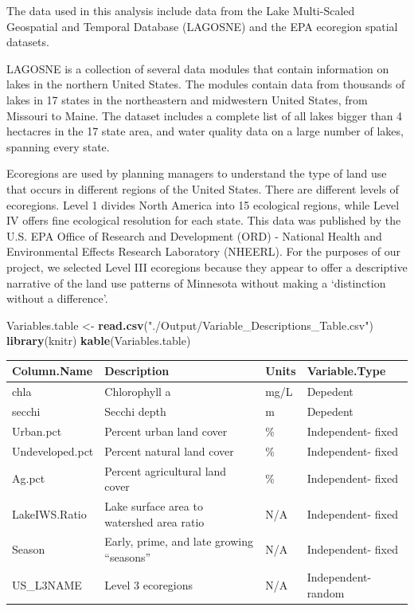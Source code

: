 \documentclass[12pt,]{article}
\newenvironment{Shaded}{\begin{snugshade}}{\end{snugshade}}
\newcommand{\KeywordTok}[1]{\textcolor[rgb]{0.13,0.29,0.53}{\textbf{#1}}}
\newcommand{\NormalTok}[1]{#1}
\newcommand{\StringTok}[1]{\textcolor[rgb]{0.31,0.60,0.02}{#1}}
\begin{document}
The data used in this analysis include data from the Lake Multi-Scaled
Geospatial and Temporal Database (LAGOSNE) and the EPA ecoregion spatial
datasets.

LAGOSNE is a collection of several data modules that contain information
on lakes in the northern United States. The modules contain data from
thousands of lakes in 17 states in the northeastern and midwestern
United States, from Missouri to Maine. The dataset includes a complete
list of all lakes bigger than 4 hectacres in the 17 state area, and
water quality data on a large number of lakes, spanning every state.

Ecoregions are used by planning managers to understand the type of land
use that occurs in different regions of the United States. There are
different levels of ecoregions. Level 1 divides North America into 15
ecological regions, while Level IV offers fine ecological resolution for
each state. This data was published by the U.S. EPA Office of Research
and Development (ORD) - National Health and Environmental Effects
Research Laboratory (NHEERL). For the purposes of our project, we
selected Level III ecoregions because they appear to offer a descriptive
narrative of the land use patterns of Minnesota without making a
`distinction without a difference'.

\begin{Shaded}
\begin{Highlighting}[]
\NormalTok{Variables.table <-}\StringTok{ }\KeywordTok{read.csv}\NormalTok{(}\StringTok{"./Output/Variable_Descriptions_Table.csv"}\NormalTok{)}
\KeywordTok{library}\NormalTok{(knitr)}
\KeywordTok{kable}\NormalTok{(Variables.table)}
\end{Highlighting}
\end{Shaded}

\begin{longtable}[]{@{}llll@{}}
\toprule
Column.Name & Description & Units & Variable.Type\tabularnewline
\midrule
\endhead
chla & Chlorophyll a & mg/L & Depedent\tabularnewline
secchi & Secchi depth & m & Depedent\tabularnewline
Urban.pct & Percent urban land cover & \% & Independent-
fixed\tabularnewline
Undeveloped.pct & Percent natural land cover & \% & Independent-
fixed\tabularnewline
Ag.pct & Percent agricultural land cover & \% & Independent-
fixed\tabularnewline
LakeIWS.Ratio & Lake surface area to watershed area ratio & N/A &
Independent- fixed\tabularnewline
Season & Early, prime, and late growing ``seasons'' & N/A & Independent-
fixed\tabularnewline
US\_L3NAME & Level 3 ecoregions & N/A & Independent-
random\tabularnewline
\bottomrule
\end{longtable}
\end{document}
